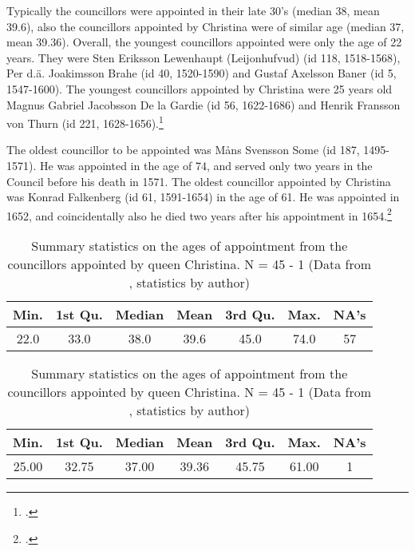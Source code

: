 Typically the councillors were appointed in their late 30's (median 38, mean 39.6), also the councillors appointed by Christina were of similar age (median 37, mean 39.36). Overall, the youngest councillors appointed were only the age of 22 years. They were Sten Eriksson Lewenhaupt (Leijonhufvud) (id 118, 1518-1568), Per d.ä. Joakimsson Brahe (id 40, 1520-1590) and Gustaf Axelsson Baner (id 5, 1547-1600). The youngest councillors appointed by Christina were 25 years old Magnus Gabriel Jacobsson De la Gardie (id 56, 1622-1686) and Henrik Fransson von Thurn (id 221, 1628-1656).\footcite{councillorsDS}

The oldest councillor to be appointed was Måns Svensson Some (id 187, 1495-1571). He was appointed in the age of 74, and served only two years in the Council before his death in 1571. The oldest councillor appointed by Christina was Konrad Falkenberg (id 61, 1591-1654) in the age of 61. He was appointed in 1652, and coincidentally also he died two years after his appointment in 1654.\footcite{councillorsDS} 

\begin{table}
	\caption[Summary statistics on the councillors ages of appointment]{Summary statistics on the councillors ages of appointment from the whole dataset (including the reign of Christina). NA meaning a missing value. N = 257 - 57 (Data from \cite{councillorsDS}, statistics by author)}
	\label{councillorsages}
	\centering
	\begin{tabular}{c c c c c c c}
		\hline
		Min. & 1st Qu. & Median & Mean & 3rd Qu. & Max. & NA's \\
		\hline
		22.0 & 33.0 & 38.0 & 39.6 & 45.0 & 74.0 & 57 \\
		\hline
	\end{tabular}
	
	\caption[Summary statistics on the ages of appointment from the councillors appointed by queen Christina]{Summary statistics on the ages of appointment from the councillors appointed by queen Christina. N = 45 - 1 (Data from \cite{councillorsDS}, statistics by author)}
	\label{agesByChristina}
	\centering
	\begin{tabular}{c c c c c c c}
		\hline
		Min. & 1st Qu. & Median & Mean & 3rd Qu. & Max. & NA's \\
		\hline
		25.00 & 32.75 & 37.00 & 39.36 & 45.75 & 61.00 & 1\\
		\hline
	\end{tabular}
\end{table}

